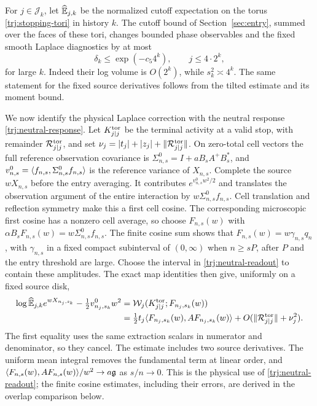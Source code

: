 For \(j\in\mathcal J_k\), let \(\widehat{\mathbb E}_{j,k}\) be the normalized
cutoff expectation on the torus \eqref{trj:stopping-tori} in history
\(k\).  The cutoff bound of
Section~\ref{sec:entry}, summed over the faces of these tori, changes
bounded phase observables and the fixed smooth Laplace diagnostics by
at most
\begin{equation}\label{trj:cutoff-error}
 \delta_k\le \exp(-c_5 4^k),\qquad j\le4\cdot2^k,
\end{equation}
for large \(k\).  Indeed their log volume is \(O(2^k)\), while
\(s_k^2\asymp4^k\).  The same statement for the fixed source derivatives
follows from the tilted estimate and its moment bound.

We now identify the physical Laplace correction with the neutral response
\eqref{trj:neutral-response}.  Let \(K_{j|j}^{\rm tor}\) be the terminal
activity at a valid stop, with remainder \(\mathcal R_{j|j}^{\rm tor}\),
and set
\(\nu_j=|t_j|+|z_j|+\|\mathcal R_{j|j}^{\rm tor}\|\).
On zero-total cell vectors the full reference observation covariance is
\(\Sigma^0_{n,s}=I+aB_sA^+B_s^*\), and
\(v^0_{n,s}=\langle f_{n,s},\Sigma^0_{n,s}f_{n,s}\rangle\) is the reference
variance of \(X_{n,s}\).  Complete the source \(wX_{n,s}\) before the
entry averaging.  It contributes \(e^{v^0_{n,s}w^2/2}\) and translates
the observation argument of the entire interaction by
\(w\Sigma^0_{n,s}f_{n,s}\).  Cell translation and reflection symmetry
make this a first cell cosine.  The corresponding microscopic first
cosine has a nonzero cell average, so choose \(F_{n,s}(w)\) with
\(\alpha B_sF_{n,s}(w)=w\Sigma^0_{n,s}f_{n,s}\).
The finite cosine sum shows that \(F_{n,s}(w)=w\gamma_{n,s}q_n\), with
\(\gamma_{n,s}\) in a fixed compact subinterval of \((0,\infty)\)
when \(n\ge sP\), after \(P\) and the entry threshold are large.
Choose the interval in \eqref{trj:neutral-readout} to contain these
amplitudes.  The exact map identities then give, uniformly on a fixed
source disk,
\begin{equation}\label{trj:gradient-diagnostic}
 \begin{split}
 \log\widehat{\mathbb E}_{j,k} e^{wX_{n_j,s_k}}-\tfrac12v^0_{n_j,s_k}w^2
 &=\mathcal W_j(K_{j|j}^{\rm tor};F_{n_j,s_k}(w))\\
 &=\tfrac12 t_j\langle F_{n_j,s_k}(w),AF_{n_j,s_k}(w)\rangle
            +O(\|\mathcal R_{j|j}^{\rm tor}\|+\nu_j^2).
 \end{split}
\end{equation}
The first equality uses the same extraction scalars in numerator and
denominator, so they cancel.  The estimate includes two source
derivatives.  The uniform mean integral removes the fundamental term
at linear order, and
\(\langle F_{n,s}(w),AF_{n,s}(w)\rangle/w^2\to a\mathfrak g\) as \(s/n\to0\).
This is the physical use of \eqref{trj:neutral-readout}; the finite
cosine estimates, including their errors, are derived in the
overlap comparison below.

